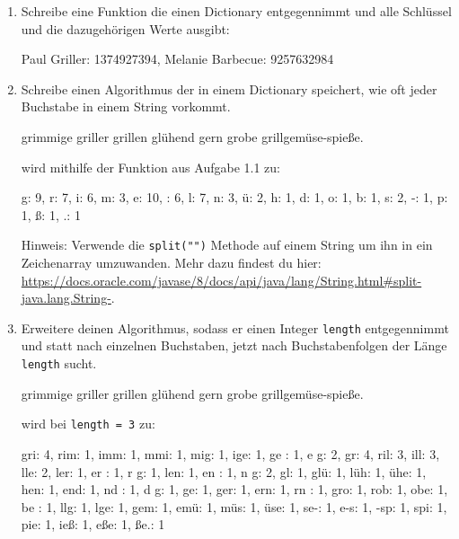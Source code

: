 \documentclass{../../sheet}
\begin{document}
\begin{enumerate}
    \item Schreibe eine Funktion die einen Dictionary entgegennimmt und alle Schlüssel und die dazugehörigen Werte ausgibt:

          \begin{ausgabe}
              Paul Griller: 1374927394, Melanie Barbecue: 9257632984
          \end{ausgabe}

    \item Schreibe einen Algorithmus der in einem Dictionary speichert, wie oft jeder Buchstabe in einem String vorkommt.

          \begin{ausgabe}
              grimmige griller grillen glühend gern grobe grillgemüse-spieße.
          \end{ausgabe}
          wird mithilfe der Funktion aus Aufgabe 1.1 zu:
          \begin{ausgabe}
              g: 9, r: 7, i: 6, m: 3, e: 10,  : 6, l: 7, n: 3, ü: 2, h: 1, d: 1, o: 1, b: 1, s: 2, -: 1, p: 1, ß: 1, .: 1
          \end{ausgabe}

          Hinweis: Verwende die \texttt{split("")} Methode auf einem String um ihn in ein Zeichenarray umzuwanden. Mehr dazu findest du hier: \url{https://docs.oracle.com/javase/8/docs/api/java/lang/String.html#split-java.lang.String-}.

    \item Erweitere deinen Algorithmus, sodass er einen Integer \texttt{length} entgegennimmt und statt nach einzelnen Buchstaben, jetzt nach Buchstabenfolgen der Länge \texttt{length} sucht.

          \begin{ausgabe}
              grimmige griller grillen glühend gern grobe grillgemüse-spieße.
          \end{ausgabe}
          wird bei \texttt{length = 3} zu:
          \begin{ausgabe}
              gri: 4, rim: 1, imm: 1, mmi: 1, mig: 1, ige: 1, ge : 1, e g: 2,  gr: 4, ril: 3, ill: 3, lle: 2, ler: 1, er : 1, r g: 1, len: 1, en : 1, n g: 2,  gl: 1, glü: 1, lüh: 1, ühe: 1, hen: 1, end: 1, nd : 1, d g: 1,  ge: 1, ger: 1, ern: 1, rn : 1, gro: 1, rob: 1, obe: 1, be : 1, llg: 1, lge: 1, gem: 1, emü: 1, müs: 1, üse: 1, se-: 1, e-s: 1, -sp: 1, spi: 1, pie: 1, ieß: 1, eße: 1, ße.: 1
          \end{ausgabe}

\end{enumerate}
\end{document}
